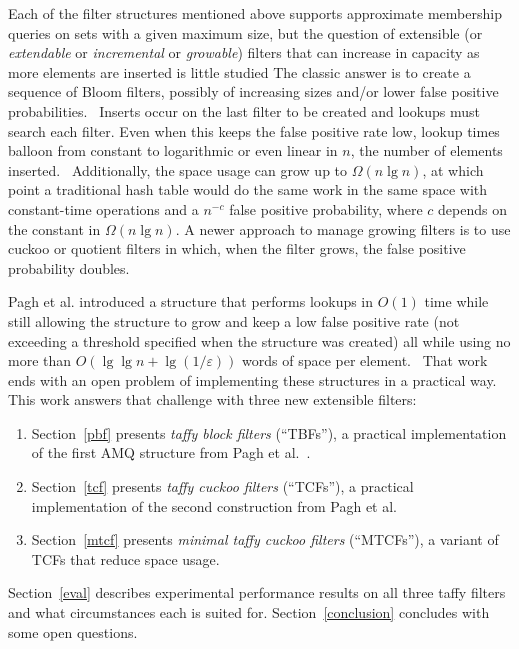 \documentclass[sigconf, nonacm]{acmart}
\begin{document}
Each of the filter structures mentioned above supports approximate membership queries on sets with a given maximum size, but the question of extensible (or {\itshape extendable} or {\itshape incremental} or {\itshape growable}) filters that can increase in capacity as more elements are inserted is little studied
The classic answer is to create a sequence of Bloom filters, possibly of increasing sizes and/or lower false positive probabilities.~\cite{dynamic-bloom,scalable-bloom}
Inserts occur on the last filter to be created and lookups must search each filter.
Even when this keeps the false positive rate low, lookup times balloon from constant to logarithmic or even linear in $n$, the number of elements inserted.~\cite{psw,logarithm,consistent-cuckoo} %
Additionally, the space usage can grow up to $\Omega(n \lg n)$, at which point a traditional hash table would do the same work in the same space with constant-time operations and a $n^{-c}$ false positive probability, where $c$ depends on the constant in $\Omega(n \lg n)$.
A newer approach to manage growing filters is to use cuckoo or quotient filters in which, when the filter grows, the false positive probability doubles.~\cite{logarithm,morton-journal,vacuum,rsqf}

Pagh et al. introduced a structure that performs lookups in $O(1)$ time while still allowing the structure to grow and keep a low false positive rate (not exceeding a threshold specified when the structure was created) all while using no more than $O(\lg \lg n + \lg (1/\varepsilon))$ words of space per element.~\cite{psw}
That work ends with an open problem of implementing these structures in a practical way.
This work answers that challenge with three new extensible filters:

\begin{enumerate}
\item Section~\ref{pbf} presents {\em taffy block filters} (``TBFs''), a practical implementation of the first AMQ structure from Pagh et al.~\cite{psw}.
\item Section~\ref{tcf} presents {\em taffy cuckoo filters} (``TCFs''), a practical implementation of the second construction from Pagh et al.
\item Section~\ref{mtcf} presents {\em minimal taffy cuckoo filters} (``MTCFs''), a variant of TCFs that reduce space usage.
\end{enumerate}

Section~\ref{eval} describes experimental performance results on all three taffy filters and what circumstances each is suited for.
Section~\ref{conclusion} concludes with some open questions.
\end{document}

